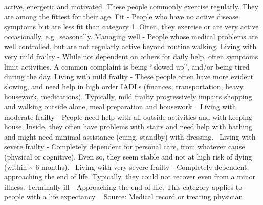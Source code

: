 \documentclass[
]{scrartcl}
\begin{document}
\begin{itemize}
{  active, energetic and motivated. These people commonly exercise
  regularly. They are among the fittest for their age. Fit - People who
  have no active disease symptoms but are less fit than category 1.
  Often, they exercise or are very active occasionally, e.g.~seasonally.
  Managing well - People whose medical problems are well controlled, but
  are not regularly active beyond routine walking. Living with very mild
  frailty - While not dependent on others for daily help, often symptoms
  limit activities. A common complaint is being ``slowed up'', and/or
  being tired during the day. Living with mild frailty - These people
  often have more evident slowing, and need help in high order IADLs
  (finances, transportation, heavy housework, medications). Typically,
  mild frailty progressively impairs shopping and walking outside alone,
  meal preparation and housework.~ Living with moderate frailty - People
  need help with all outside activities and with keeping house. Inside,
  they often have problems with stairs and need help with bathing and
  might need minimal assistance (cuing, standby) with dressing.~ Living
  with severe frailty - Completely dependent for personal care, from
  whatever cause (physical or cognitive). Even so, they seem stable and
  not at high risk of dying (within \textasciitilde{} 6 months).~ Living
  with very severe frailty - Completely dependent, approaching the end
  of life. Typically, they could not recover even from a minor illness.
  Terminally ill - Approaching the end of life. This category applies to
  people with a life expectancy ~} Source: Medical record or treating
  physician


\end{itemize}
\end{document}
